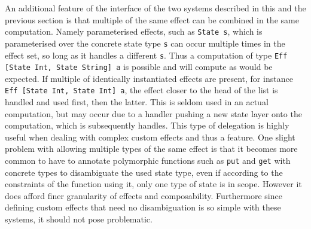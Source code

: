 An additional feature of the interface of the two systems described in this and
the previous section is that multiple of the same effect can be combined in the
same computation. Namely parameterised effects, such as \texttt{State s}, which
is parameterised over the concrete state type \texttt{s} can occur multiple
times in the effect set, so long as it handles a different \texttt{s}. Thus a
computation of type \texttt{Eff [State Int, State String] a} is possible and
will compute as would be expected. If multiple of identically instantiated
effects are present, for instance \texttt{Eff [State Int, State Int] a}, the
effect closer to the head of the list is handled and used first, then the
latter. This is seldom used in an actual computation, but may occur due to a
handler pushing a new state layer onto the computation, which is subsequently
handles. This type of delegation is highly useful when dealing with complex
custom effects and thus a feature. One slight problem with allowing multiple
types of the same effect is that it becomes more common to have to annotate
polymorphic functions such as \texttt{put} and \texttt{get} with concrete types
to disambiguate the used state type, even if according to the constraints of the
function using it, only one type of state is in scope. However it does afford
finer granularity of effects and composability. Furthermore since defining
custom effects that need no disambiguation is so simple with these systems, it
should not pose problematic.
